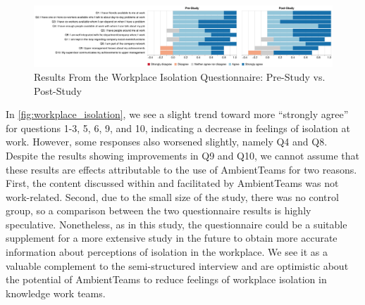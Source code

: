\begin{figure}[h]
    \centering
    \includegraphics[width=\linewidth]{plots/workplace_isolation_likert.pdf}
    \caption{Results From the Workplace Isolation Questionnaire: Pre-Study vs. Post-Study}
    \label{fig:workplace_isolation}
\end{figure}

In \autoref{fig:workplace_isolation}, we see a slight trend toward more \enquote{strongly agree} for questions 1-3, 5, 6, 9, and 10, indicating a decrease in feelings of isolation at work. However, some responses also worsened slightly, namely Q4 and Q8. Despite the results showing improvements in Q9 and Q10, we cannot assume that these results are effects attributable to the use of AmbientTeams for two reasons. First, the content discussed within and facilitated by AmbientTeams was not work-related. Second, due to the small size of the study, there was no control group, so a comparison between the two questionnaire results is highly speculative. Nonetheless, as in this study, the questionnaire could be a suitable supplement for a more extensive study in the future to obtain more accurate information about perceptions of isolation in the workplace. We see it as a valuable complement to the semi-structured interview and are optimistic about the potential of AmbientTeams to reduce feelings of workplace isolation in knowledge work teams.

